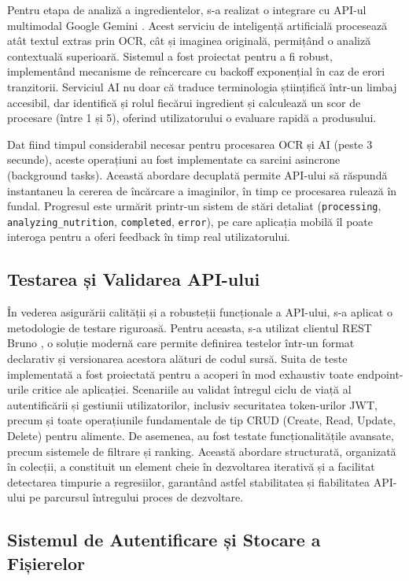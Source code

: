 Pentru etapa de analiză a ingredientelor, s-a realizat o integrare cu API-ul multimodal Google Gemini \cite{GeminiAPI}. Acest serviciu de inteligență artificială procesează atât textul extras prin OCR, cât și imaginea originală, permițând o analiză contextuală superioară. Sistemul a fost proiectat pentru a fi robust, implementând mecanisme de reîncercare cu backoff exponențial în caz de erori tranzitorii. Serviciul AI nu doar că traduce terminologia științifică într-un limbaj accesibil, dar identifică și rolul fiecărui ingredient și calculează un scor de procesare (între 1 și 5), oferind utilizatorului o evaluare rapidă a produsului.

Dat fiind timpul considerabil necesar pentru procesarea OCR și AI (peste 3 secunde), aceste operațiuni au fost implementate ca sarcini asincrone (background tasks). Această abordare decuplată permite API-ului să răspundă instantaneu la cererea de încărcare a imaginilor, în timp ce procesarea rulează în fundal. Progresul este urmărit printr-un sistem de stări detaliat (\texttt{processing}, \texttt{analyzing\_nutrition}, \texttt{completed}, \texttt{error}), pe care aplicația mobilă îl poate interoga pentru a oferi feedback în timp real utilizatorului.

\subsection{Testarea și Validarea API-ului}

În vederea asigurării calității și a robusteții funcționale a API-ului, s-a aplicat o metodologie de testare riguroasă. Pentru aceasta, s-a utilizat clientul REST Bruno \cite{Bruno}, o soluție modernă care permite definirea testelor într-un format declarativ și versionarea acestora alături de codul sursă. Suita de teste implementată a fost proiectată pentru a acoperi în mod exhaustiv toate endpoint-urile critice ale aplicației. Scenariile au validat întregul ciclu de viață al autentificării și gestiunii utilizatorilor, inclusiv securitatea token-urilor JWT, precum și toate operațiunile fundamentale de tip CRUD (Create, Read, Update, Delete) pentru alimente. De asemenea, au fost testate funcționalitățile avansate, precum sistemele de filtrare și ranking. Această abordare structurată, organizată în colecții, a constituit un element cheie în dezvoltarea iterativă și a facilitat detectarea timpurie a regresiilor, garantând astfel stabilitatea și fiabilitatea API-ului pe parcursul întregului proces de dezvoltare.
\subsection{Sistemul de Autentificare și Stocare a Fișierelor}

